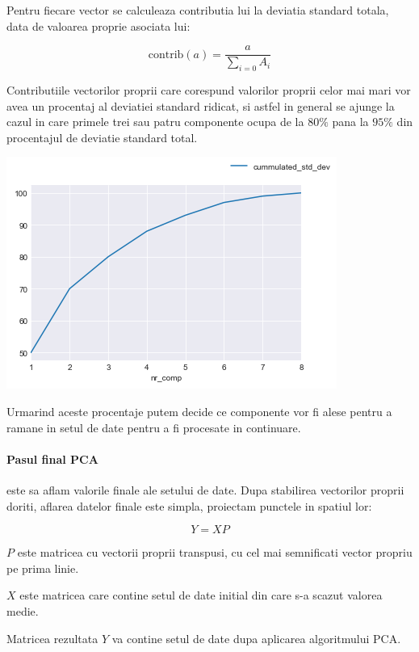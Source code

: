 \documentclass[12pt,oneside]{article}
\begin{document}
Pentru fiecare vector se calculeaza contributia lui la deviatia standard totala, data de valoarea proprie asociata lui:

\begin{equation}
	\text{contrib}(a)=\frac{a}{\sum_{i=0} A_i}
\end{equation}

Contributiile vectorilor proprii care corespund valorilor proprii celor mai mari vor avea un procentaj al deviatiei standard ridicat, si astfel in general se ajunge la cazul in care primele trei sau patru componente ocupa de la $80\%$ pana la $95\%$ din procentajul de deviatie standard total. 
\begin{center}
	\includegraphics[scale=1]{pca_features}
\end{center}

Urmarind aceste procentaje putem decide ce componente vor fi alese pentru a ramane in setul de date pentru a fi procesate in continuare.


\paragraph{Pasul final PCA} este sa aflam valorile finale ale setului de date. Dupa stabilirea vectorilor proprii doriti, aflarea datelor finale este simpla, proiectam punctele in spatiul lor: 

\begin{equation}
	Y=XP
\end{equation}

\textbf{$P$} este matricea cu vectorii proprii transpusi, cu cel mai semnificati vector propriu pe prima linie.

\textbf{$X$} este matricea care contine setul de date initial din care s-a scazut valorea medie.

Matricea rezultata \textbf{$Y$} va contine setul de date dupa aplicarea algoritmului PCA.
\end{document}
